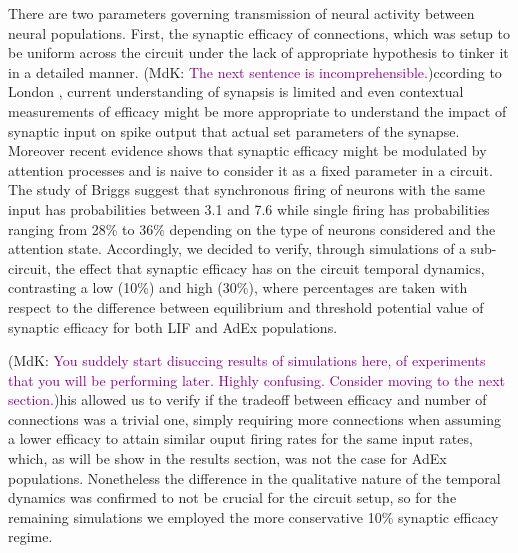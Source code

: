 \documentclass[10pt]{article}
\newcommand{\noteMdK}[2]{(MdK: \textcolor{purple}{#1})}
\begin{document}
There are two parameters governing transmission of neural activity between neural populations.
First, the synaptic efficacy of connections, which was setup to be uniform across the circuit under the lack of appropriate hypothesis to tinker it in a detailed manner.
\noteMdK{The next sentence is incomprehensible.}
According to London \cite{London_2002}, current understanding of synapsis is limited and even contextual measurements of efficacy might be more appropriate to understand the impact of synaptic input on spike output that actual set parameters of the synapse.
Moreover recent evidence \cite{Briggs_2013} shows that synaptic efficacy might be modulated by attention processes and is naive to consider it as a fixed parameter in a circuit.
The study of Briggs \cite{Briggs_2013} suggest that synchronous firing of neurons with the same input has probabilities between 3.1 and 7.6 while single firing has probabilities ranging from 28\% to 36\% depending on the type of neurons considered and the attention state.
Accordingly, we decided to verify, through simulations of a  sub-circuit, the effect that synaptic efficacy has on the circuit temporal dynamics, contrasting a low (10\%) and high (30\%), where percentages are taken with respect to the difference between equilibrium and threshold potential value of synaptic efficacy for both LIF and AdEx populations.

\noteMdK{You suddely start disuccing results of simulations here, of experiments that you will be performing later. Highly confusing. Consider moving to the next section.}

This allowed us to verify if the tradeoff between efficacy and number of connections was a trivial one, simply requiring more connections when assuming a lower efficacy to attain similar ouput firing rates for the same input rates, which, as will be show in the results section, was not the case for AdEx populations.
Nonetheless the difference in the qualitative nature of the temporal dynamics was confirmed to not be crucial for the circuit setup, so for the remaining simulations we employed the more conservative 10\% synaptic efficacy regime.
\end{document}

